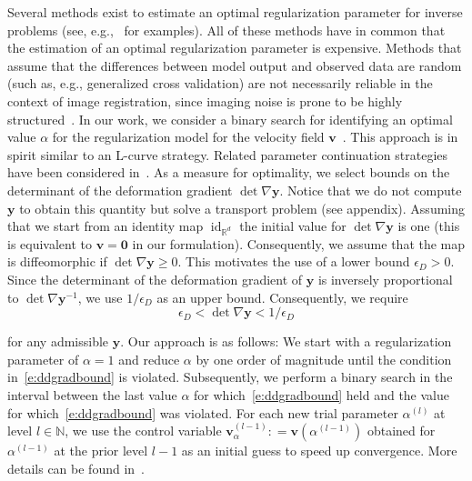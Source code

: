 \documentclass[11pt]{amsart}
\newcommand\igrad{\ensuremath{\nabla}}
\newcommand{\defeq}{\ensuremath{\mathrel{\mathop:}=}}
\renewcommand{\vec}[1]{\ensuremath{\boldsymbol{#1}}}
\begin{document}
Several methods exist to estimate an optimal regularization parameter for inverse problems (see, e.g.,~\cite{Vogel:2002a} for examples). All of these methods have in common that the estimation of an optimal regularization parameter is expensive. Methods that assume that the differences between model output and observed data are random (such as, e.g., generalized cross validation) are not necessarily reliable in the context of image registration, since imaging noise is prone to be highly structured~\cite{Haber:2006a}. In our work, we consider a binary search for identifying an optimal value $\alpha$ for the regularization model for the velocity field $\vec{v}$~\cite{Mang:2015a,Mang:2019a,Himthani:2022a}. This approach is in spirit similar to an L-curve strategy. Related parameter continuation strategies have been considered in~\cite{Azencott:2010a,Haber:2000a,Haber:2006a}. As a measure for optimality, we select bounds on the determinant of the deformation gradient $\det \igrad \vec{y}$. Notice that we do not compute $\vec{y}$ to obtain this quantity but solve a transport problem (see appendix). Assuming that we start from an identity map $\operatorname{id}_{\mathbb{R}^d}$ the initial value for $\det \igrad \vec{y}$ is one (this is equivalent to $\vec{v} = \vec{0}$ in our formulation). Consequently, we assume that the map is diffeomorphic if $\det \igrad \vec{y} \geq 0$. This motivates the use of a lower bound $\epsilon_D > 0$. Since the determinant of the deformation gradient of $\vec{y}$ is inversely proportional to $\det \igrad \vec{y}^{-1}$, we use $1/\epsilon_D$ as an upper bound. Consequently, we require
\begin{equation}\label{e:ddgradbound}
\epsilon_D < \det \igrad \vec{y} < 1/\epsilon_D
\end{equation}

\noindent for any admissible $\vec{y}$. Our approach is as follows: We start with a regularization parameter of $\alpha = 1$ and reduce $\alpha$ by one order of magnitude until the condition in~\eqref{e:ddgradbound} is violated. Subsequently, we perform a binary search in the interval between the last value $\alpha$ for which~\eqref{e:ddgradbound} held and the value for which~\eqref{e:ddgradbound} was violated. For each new trial parameter $\alpha^{(l)}$ at level $l \in \mathbb{N}$, we use the control variable $\vec{v}_{\alpha}^{(l-1)} \defeq \vec{v}(\alpha^{(l-1)})$ obtained for $\alpha^{(l-1)}$ at the prior level $l-1$ as an initial guess to speed up convergence. More details can be found in~\cite{Mang:2015a,Mang:2019a}.
\end{document}
